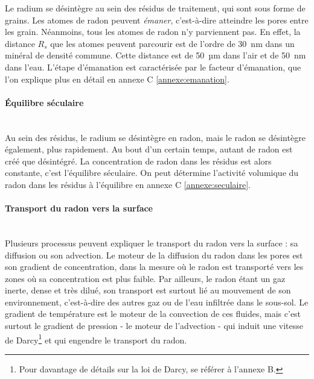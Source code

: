 \documentclass{article}
\begin{document}
Le radium se désintègre au sein des résidus de traitement, qui sont sous forme de grains. Les atomes de radon peuvent \emph{émaner}, c'est-à-dire atteindre les pores entre les grain. Néanmoins, tous les atomes de radon n'y parviennent pas. En effet, la distance $R_s$ que les atomes peuvent parcourir est de l’ordre de 30~nm dans un minéral de densité commune. Cette distance est de 50~µm dans l’air et de 50~nm dans l’eau. L'étape d'émanation est caractérisée par le facteur d'émanation, que l'on explique plus en détail en annexe C \ref{annexe:emanation}.

\paragraph{Équilibre séculaire \\ \\} Au sein des résidus, le radium se désintègre en radon, mais le radon se désintègre également, plus rapidement. Au bout d’un certain temps, autant de radon est créé que désintégré. La concentration de radon dans les résidus est alors constante, c’est l’équilibre séculaire. On peut détermine l'activité volumique du radon dans les résidus à l'équilibre en annexe C \ref{annexe:seculaire}.

\paragraph{Transport du radon vers la surface \\ \\} Plusieurs processus peuvent expliquer le transport du radon vers la surface \cite{irsn_ineris_radon_nodate} : sa diffusion ou son advection. Le moteur de la diffusion du radon dans les pores est son gradient de concentration, dans la mesure où le radon est transporté vers les zones où sa concentration est plus faible. Par ailleurs, le radon étant un gaz inerte, dense et très dilué, son transport est surtout lié au mouvement de son environnement, c’est-à-dire des autres gaz ou de l’eau infiltrée dans le sous-sol. Le gradient de température est le moteur de la convection de ces fluides, mais c’est surtout le gradient de pression - le moteur de l’advection - qui induit une vitesse de Darcy\footnote{Pour davantage de détails sur la loi de Darcy, se référer à l'annexe B.} et qui engendre le transport du radon.
\end{document}
